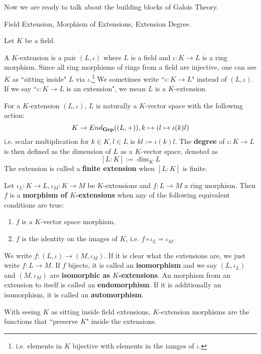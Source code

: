 \documentclass[../book.tex]{subfiles}
\begin{document}
Now we are ready to talk about the building blocks of Galois Theory.

\begin{dfn} Field Extension, Morphism of Extensions, Extension Degree.

    Let $K$ be a field. 

    A $K$-extension is a pair $(L,\iota)$ where $L$ is a field 
    and $\iota : K \to L$ is a ring morphism. 
    Since all ring morphisms of rings from a field are injective,
    one can see $K$ as ``sitting inside" $L$ via $\iota$.\footnote{
        i.e. elements in $K$ bijective with 
        elements in the iamges of $\iota$. 
    }
    We sometimes write ``$\iota : K \to L$" instead of $(L,\iota)$.
    If we say ``$\iota : K \to L$ is an extension", we mean
    $L$ is a $K$-extension.
    
    For a $K$-extension $(L,\iota)$, 
    $L$ is naturally a $K$-vector space with the following action: 
    \[
        K \to End_{\mathbf{Grp}}((L,+)), k \mapsto (l \mapsto \iota(k) l)
    \]
    i.e. scalar multiplication for $k \in K, l \in L$ is $kl := \iota(k)l$.
    The \textbf{degree} of $\iota : K \to L$ is then defined as
    the dimension of $L$ as a $K$-vector space, denoted as \[
        [L : K] := \dim_K L
    \]
    The extension is called a \textbf{finite extension} when $[L:K]$ is finite. 
    
    Let $\iota_L : K \to L, \iota_M : K \to M$ be $K$-extensions and
    $f : L \to M$ a ring morphism.
    Then $f$ is a \textbf{morphism of $K$-extensions} when 
    any of the following equivalent conditions are true: 
    \begin{enumerate}
        \item $f$ is a $K$-vector space morphism.
        \item $f$ is the identity on the images of $K$, i.e.
        $f\circ\iota_L = \iota_M$
    \end{enumerate}
    We write $f : (L,\iota) \to (M,\iota_M)$. 
    If it is clear what the extensions are, we just write $f : L \to M$. 
    If $f$ bijects, it is called an \textbf{isomorphism} and
    we say $(L,\iota_L)$ and $(M,\iota_M)$ are \textbf{isomorphic as $K$-extensions}.
    An morphism from an extension to itself is called an \textbf{endomorphism}.
    If it is additionally an isomorphism, it is called an \textbf{automorphism}. 
    
    With seeing $K$ as sitting inside field extensions, 
    $K$-extension morphisms are the functions that ``preserve $K$" 
    inside the extensions. 
\end{dfn}
\end{document}
